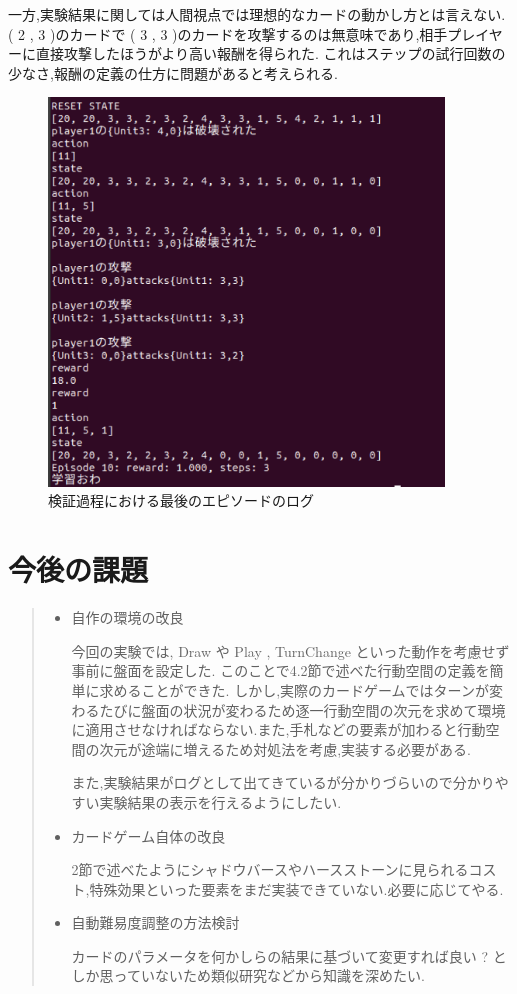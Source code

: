 \documentclass{jarticle}     %
\begin{document}
一方,実験結果に関しては人間視点では理想的なカードの動かし方とは言えない.
 ( 2 , 3 )のカードで ( 3 , 3 )のカードを攻撃するのは無意味であり,相手プレイヤーに直接攻撃したほうがより高い報酬を得られた.
これはステップの試行回数の少なさ,報酬の定義の仕方に問題があると考えられる.
\begin{figure}[htbp]
  \centering
  \includegraphics[width=105mm]{assets/Log.eps}
  \caption{検証過程における最後のエピソードのログ}
  \label{fig:Log}
\end{figure}

\section{今後の課題}


\begin{quote}
  \begin{itemize}
   \item 自作の環境の改良
   \par
    今回の実験では, Draw や Play , TurnChange といった動作を考慮せず事前に盤面を設定した.
    このことで4.2節で述べた行動空間の定義を簡単に求めることができた.
    しかし,実際のカードゲームではターンが変わるたびに盤面の状況が変わるため逐一行動空間の次元を求めて環境に適用させなければならない.また,手札などの要素が加わると行動空間の次元が途端に増えるため対処法を考慮,実装する必要がある.\par
    また,実験結果がログとして出てきているが分かりづらいので分かりやすい実験結果の表示を行えるようにしたい.
    \item カードゲーム自体の改良
    \par
    2節で述べたようにシャドウバースやハースストーンに見られるコスト,特殊効果といった要素をまだ実装できていない.必要に応じてやる.
    \item 自動難易度調整の方法検討
    \par
    カードのパラメータを何かしらの結果に基づいて変更すれば良い ? としか思っていないため類似研究などから知識を深めたい.

  \end{itemize}
 \end{quote}



\end{document}
